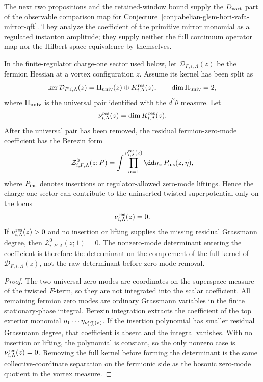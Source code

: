 The next two propositions and the retained-window bound supply the
\(D_{\rm vort}\) part of the observable comparison map for
Conjecture~\ref{conj:abelian-glsm-hori-vafa-mirror-qft}.  They analyze the
coefficient of the primitive mirror monomial as a regulated instanton
amplitude; they supply neither the full continuum operator map nor the
Hilbert-space equivalence by themselves.

\begin{proposition}
\label{prop:glsm-vortex-zero-mode-filter}
In the finite-regulator charge-one sector used below, let
\(\mathcal D_{F,i,\Lambda}(z)\) be the fermion Hessian at a vortex
configuration \(z\).  Assume its kernel has been split as
\[
  \ker \mathcal D_{F,i,\Lambda}(z)
  =
  \Pi_{\rm univ}(z)\oplus K^{\rm res}_{i,\Lambda}(z),
  \qquad
  \dim \Pi_{\rm univ}=2,
\]
where \(\Pi_{\rm univ}\) is the universal pair identified with the
\(d^2\widetilde\theta\) measure.  Let
\[
  \nu^{\rm res}_{i,\Lambda}(z)=\dim K^{\rm res}_{i,\Lambda}(z).
\]
After the universal pair has been removed, the residual fermion-zero-mode
coefficient has the Berezin form
\begin{equation}
  \mathcal Z^0_{i,F,\Lambda}(z;P)
  =
  \int
  \prod_{\alpha=1}^{\nu^{\rm res}_{i,\Lambda}(z)} \dd\eta_\alpha\,
  P_{\rm ins}(z,\eta),
  \label{eq:glsm-vortex-berezin-zero-mode-filter}
\end{equation}
where \(P_{\rm ins}\) denotes insertions or regulator-allowed zero-mode
liftings.  Hence the charge-one sector can contribute to the uninserted
twisted superpotential only on the locus
\[
  \nu^{\rm res}_{i,\Lambda}(z)=0 .
\]
If \(\nu^{\rm res}_{i,\Lambda}(z)>0\) and no insertion or lifting supplies the
missing residual Grassmann degree, then
\(\mathcal Z^0_{i,F,\Lambda}(z;1)=0\).  The nonzero-mode determinant entering
the coefficient is therefore the determinant on the complement of the full
kernel of \(\mathcal D_{F,i,\Lambda}(z)\), not the raw determinant before
zero-mode removal.
\end{proposition}

\begin{proof}
The two universal zero modes are coordinates on the superspace measure of the
twisted \(F\)-term, so they are not integrated into the scalar coefficient.
All remaining fermion zero modes are ordinary Grassmann variables in the
finite stationary-phase integral.  Berezin integration extracts the coefficient
of the top exterior monomial
\(\eta_1\cdots\eta_{\nu^{\rm res}_{i,\Lambda}(z)}\).  If the insertion
polynomial has smaller residual Grassmann degree, that coefficient is absent
and the integral vanishes.  With no insertion or lifting, the polynomial is
constant, so the only nonzero case is
\(\nu^{\rm res}_{i,\Lambda}(z)=0\).  Removing the full kernel before forming
the determinant is the same collective-coordinate separation on the fermionic
side as the bosonic zero-mode quotient in the vortex measure.
\end{proof}

